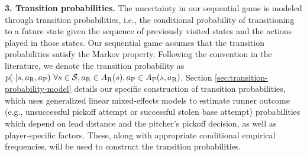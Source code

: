 \documentclass[11pt]{article}
\begin{document}
    {\bf 3. Transition probabilities.} The uncertainty in our sequential game is modeled through transition probabilities, i.e., the conditional probability of transitioning to a future state given the sequence of previously visited states and the actions played in those states. Our sequential game assumes that the transition probabilities satisfy the Markov property.  Following the convention in the literature, we denote the transition probability as $p(\cdot|s,a_\text{R},a_\text{P}) \ \forall s \in {\cal S}, a_\text{R} \in A_\text{R}(s), a_\text{P} \in A_\text{P}(s,a_\text{R})$. Section \ref{sec:transition-probability-model} details our specific construction of transition probabilities, which uses generalized linear mixed-effects models to estimate runner outcome (e.g., unsuccessful pickoff attempt or successful stolen base attempt) probabilities which depend on lead distance and the pitcher's pickoff decision, as well as player-specific factors. These, along with appropriate conditional empirical frequencies, will be used to construct the transition probabilities.
\end{document}

